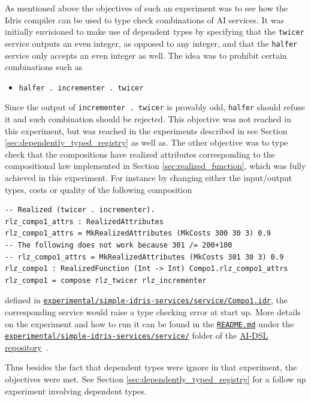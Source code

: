 \documentclass[]{report}
\newcommand{\nil}[2][]{\todo[color=purple,author=nil, #1]{#2}}
\begin{document}
As mentioned above the objectives of such an experiment was to see how
the Idris compiler can be used to type check combinations of AI
services.  It was initially envisioned to make use of dependent types
by specifying that the \texttt{twicer} service outputs an even
integer, as opposed to any integer, and that the \texttt{halfer}
service only accepts an even integer as well.  The idea was to
prohibit certain combinations such as
\begin{itemize}
\item \texttt{halfer . incrementer . twicer}
\end{itemize}
Since the output of \texttt{incrementer . twicer} is provably odd,
\texttt{halfer} should refuse it and such combination should be
rejected.  This objective was not reached in this experiment, but was
reached in the experiments described in see Section
\ref{sec:dependently_typed_registry} as well as\nil{Add ref to Sam's work}.  The other
objective was to type check that the compositions have realized
attributes corresponding to the compositional law implemented in
Section \ref{sec:realized_function}, which was fully achieved in this
experiment.  For instance by changing either the input/output types,
costs or quality of the following composition
\begin{verbatim}
-- Realized (twicer . incrementer).
rlz_compo1_attrs : RealizedAttributes
rlz_compo1_attrs = MkRealizedAttributes (MkCosts 300 30 3) 0.9
-- The following does not work because 301 /= 200+100
-- rlz_compo1_attrs = MkRealizedAttributes (MkCosts 301 30 3) 0.9
rlz_compo1 : RealizedFunction (Int -> Int) Compo1.rlz_compo1_attrs
rlz_compo1 = compose rlz_twicer rlz_incrementer
\end{verbatim}
defined in
\href{https://github.com/singnet/ai-dsl/blob/master/experimental/simple-idris-services/service/Compo1.idr}{\texttt{experimental/simple-idris-services/service/Compo1.idr}},
the corresponding service would raise a type checking error at start
up.  More details on the experiment and how to run it can be found in
the
\href{https://github.com/singnet/ai-dsl/blob/master/experimental/simple-idris-services/README.md}{\texttt{README.md}}
under the
\href{https://github.com/singnet/ai-dsl/blob/master/experimental/simple-idris-services/}{\texttt{experimental/simple-idris-services/service/}}
folder of the \href{https://github.com/singnet/ai-dsl/}{AI-DSL
  repository}~\cite{AIDSLRepo}.

Thus besides the fact that dependent types were ignore in that
experiment, the objectives were met.  See Section \ref{sec:dependently_typed_registry}
for a follow up experiment involving dependent types.
\end{document}
